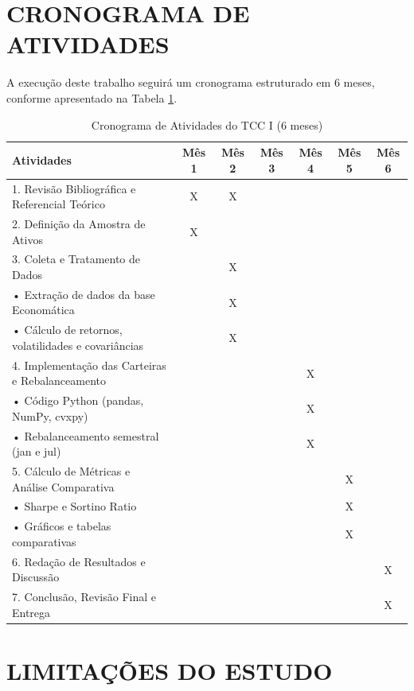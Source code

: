 \section{CRONOGRAMA DE ATIVIDADES}

A execução deste trabalho seguirá um cronograma estruturado em 6 meses, conforme apresentado na Tabela \ref{tab:cronograma}.

\begin{table}[h]
\centering
\caption{Cronograma de Atividades do TCC I (6 meses)}
\begin{tabular}{|p{5cm}|c|c|c|c|c|c|}
\hline
\textbf{Atividades} & \textbf{Mês 1} & \textbf{Mês 2} & \textbf{Mês 3} & \textbf{Mês 4} & \textbf{Mês 5} & \textbf{Mês 6} \\
\hline
1. Revisão Bibliográfica e Referencial Teórico & X & X & & & & \\
\hline
2. Definição da Amostra de Ativos & X & & & & & \\
\hline
3. Coleta e Tratamento de Dados & & X & & & & \\
\hline
\quad • Extração de dados da base Economática & & X & & & & \\
\hline
\quad • Cálculo de retornos, volatilidades e covariâncias & & X & & & & \\
\hline
4. Implementação das Carteiras e Rebalanceamento & & & & X & & \\
\hline
\quad • Código Python (pandas, NumPy, cvxpy) & & & & X & & \\
\hline
\quad • Rebalanceamento semestral (jan e jul) & & & & X & & \\
\hline
5. Cálculo de Métricas e Análise Comparativa & & & & & X & \\
\hline
\quad • Sharpe e Sortino Ratio & & & & & X & \\
\hline
\quad • Gráficos e tabelas comparativas & & & & & X & \\
\hline
6. Redação de Resultados e Discussão & & & & & & X \\
\hline
7. Conclusão, Revisão Final e Entrega & & & & & & X \\
\hline
\end{tabular}
\label{tab:cronograma}
\end{table}

\section{LIMITAÇÕES DO ESTUDO}

